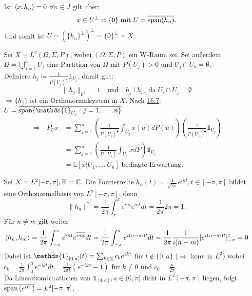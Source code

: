 \begin{beweis}
	Ist $ \langle x , h_{n} \rangle = 0$ $\forall n \in J$ gilt aber:
		\[ x \in U^{\bot} = \{ 0 \} \text{ mit } U = \overline{\operatorname{span}(h_{n})}. \] 
	Und somit ist $U = \left( \{ h_{n} \}^{\bot} \right)^{\bot} = \{ 0 \}^{\bot} = X$.
\end{beweis}


\begin{beispiel}
	Sei $X = L^{2}(\Omega, \Sigma, P)$, wobei $(\Omega, \Sigma, P)$ ein W-Raum sei. Sei au{\ss}erdem $\Omega = \bigcup_{j = 1}^{n} U_{j}$ eine Partition von $\Omega$ mit $P(U_{j}) > 0$ und $U_{j} \cap U_{k} = \emptyset$. \\
	Definiere $h_{j} \coloneqq \frac{1}{P(U_{j})^{\frac{1}{2}}} \mathds{1}_{U_{j}}$, damit gilt:
	\[ \| h_{j} \|_{L^{2}} = 1 \quad \text{und} \quad h_{j} \bot h_{i}, \text{ da } U_{i} \cap U_{j} = \emptyset  \]
	$\Rightarrow \{ h_{j} \}$ ist ein Orthonormalsystem in $X$. Nach \hyperref[satz:16.7]{16.7}: $U = \overline{\ospan\{\mathds{1}_{U_{j}}: j = 1, \dotsc, n\}}$ \\
	\begin{align*}
		\Rightarrow \text{ } P_{U} x & = \sum_{j = 1}^{n} \left( \frac{1}{P(U_{j})^{\frac{1}{2}}} \int_{U_{j}} x(u) dP(u) \right) \left( \frac{1}{P(U_{j})	^{\frac{1}{2}}} \mathds{1}_{U_{j}} \right) \\
		& = \sum_{j = 1}^{n} \left( \frac{1}{P(U_{j})} \int_{U_{j}} x dP \right) \mathds{1}_{U_{j}} \\
		& = \mathds{E}[x | U_{1}, \dotsc, U_{n}] \text{ bedingte Erwartung.}
	\end{align*}
\end{beispiel}


\begin{beispiel}
	Sei $X = L^{2}[-\pi, \pi], \mathbb{K} = \mathbb{C}$. Die Fourierreihe $h_{n}(t) = \frac{1}{\sqrt{2 \pi}} e^{int}, t \in [-\pi , \pi]$ bildet eine Orthonormalbasis von $L^{2}[-\pi, \pi]$, denn 
	\[ \| h_{n} \|^{2} = \frac{1}{2\pi} \int_{\pi}^{\pi} e^{int} e^{\overline{int}} dt = \frac{1}{2\pi} 2 \pi = 1. \]
	Für $n \neq m$ gilt weiter
	\[ \langle h_{n} , h_{m} \rangle = \frac{1}{2 \pi} \int_{- \pi}^{\pi} e^{int} e^{\overline{imt}} dt = \frac{1}{2 \pi} \int_{- \pi}^{\pi} e^{i(n - m)t} dt = \frac{1}{2 \pi} \frac{1}{i(n - m)} [ e^{i(n - m)t} ]_{-\pi}^{\pi} = 0 \]
	Dabei ist $\mathds{1}_{[0, a]}(t) = \sum_{k \in \MdZ} c_{k} e^{ikt}$ für $t \notin \{ 0, a \}$ ($\Rightarrow$ konv in $L^{2}$) wobei $c_{k} = \frac{1}{2 \pi} \int_{0}^{a} e^{-ikt} dt = \frac{1}{2 \pi k} \left( e^{-ika} - 1 \right)$ für $k \neq 0$ und $c_{0} = \frac{a}{2 \pi}$. \\
	Da Linearkombinationen von $\mathds{1}_{[0, a]}, a \in (0, \pi]$ dicht in $L^{2}[-\pi, \pi]$ liegen, folgt $\overline{\operatorname{span}\left(e^{in \cdot} \right)} = L^{2}[-\pi, \pi]$.
\end{beispiel}


